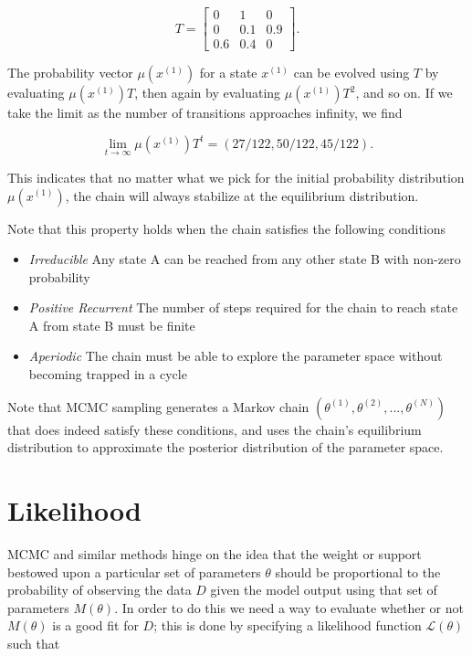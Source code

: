     $$
    T = 
    \begin{bmatrix}
        0 & 1 & 0 \\
        0 & 0.1 & 0.9 \\
        0.6 & 0.4 & 0
    \end{bmatrix}.
    $$

    The probability vector $\mu(x^{(1)})$ for a state $x^{(1)}$ can be evolved using $T$ by evaluating $\mu(x^{(1)})T$, then again by evaluating $\mu(x^{(1)})T^2$, and so on. If we take the limit as the number of transitions approaches infinity, we find

    $$
        \lim_{t \to \infty} \mu(x^{(1)})T^t = (27/122, 50/122, 45/122).
    $$

    This indicates that no matter what we pick for the initial probability distribution $\mu(x^{(1)})$, the chain will always stabilize at the equilibrium distribution.

    Note that this property holds when the chain satisfies the following conditions

    \begin{itemize}
        \item \textit{Irreducible} Any state A can be reached from any other state B with non-zero probability
        \item \textit{Positive Recurrent} The number of steps required for the chain to reach state A from state B must be finite
        \item \textit{Aperiodic} The chain must be able to explore the parameter space without becoming trapped in a cycle
    \end{itemize}

    Note that MCMC sampling generates a Markov chain $(\theta^{(1)}, \theta^{(2)},..., \theta^{(N)})$ that does indeed satisfy these conditions, and uses the chain's equilibrium distribution to approximate the posterior distribution of the parameter space.    


\section{Likelihood}

    MCMC and similar methods hinge on the idea that the weight or support bestowed upon a particular set of parameters $\theta$ should be proportional to the probability of observing the data $D$ given the model output using that set of parameters $M(\theta)$. In order to do this we need a way to evaluate whether or not $M(\theta)$ is a good fit for $D$; this is done by specifying a likelihood function $\mathcal{L}(\theta)$ such that

